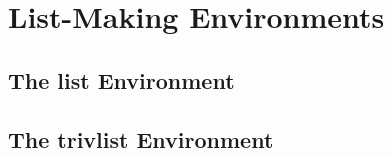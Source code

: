 \section{List-Making Environments}
\subsection{The list Environment}


\subsection{The trivlist Environment}